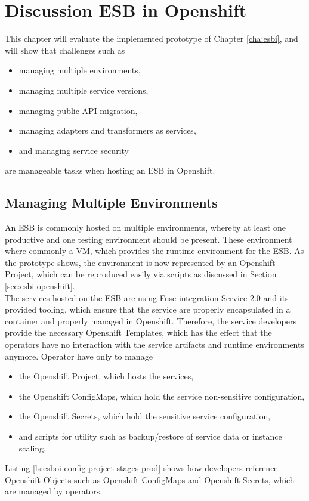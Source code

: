 \chapter{Discussion ESB in Openshift}
\label{cha:esbd}
This chapter will evaluate the implemented prototype of Chapter \vref{cha:esbi}, and will show that challenges such as
\begin{itemize}
	\item managing multiple environments,
	\item managing multiple service versions,
	\item managing public API migration,
	\item managing adapters and transformers as services,
	\item and managing service security
\end{itemize}
are manageable tasks when hosting an ESB in Openshift. 

\section{Managing Multiple Environments}
\label{sec:esbd-multiple-env}
An ESB is commonly hosted on multiple environments, whereby at least one productive and one testing environment should be present. These environment where commonly a VM, which provides the runtime environment for the ESB. As the prototype shows, the environment is now represented by an Openshift Project, which can be reproduced easily via scripts as discussed in Section \vref{sec:esbi-openshift}. \\

The services hosted on the ESB are using Fuse integration Service 2.0 and its provided tooling, which ensure that the service are properly encapsulated in a container and properly managed in Openshift. Therefore, the service developers provide the necessary Openshift Templates, which has the effect that the operators have no interaction with the service artifacts and runtime environments anymore. Operator have only to manage
\begin{itemize}
	\item the Openshift Project, which hosts the services,
	\item the Openshift ConfigMaps, which hold the service non-sensitive configuration,
	\item the Openshift Secrets, which hold the sensitive service configuration,
	\item and scripts for utility such as backup/restore of service data or instance scaling.
\end{itemize} 
Listing \vref{ls:esboi-config-project-stages-prod} shows how developers reference Openshift Objects such as Openshift ConfigMaps and Openshift Secrets, which are managed by operators. 

